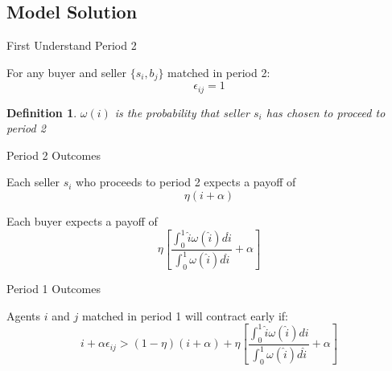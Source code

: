 \documentclass{beamer}
\newtheorem{deff}{Definition}
\begin{document}
\subsection{Model Solution}

\begin{frame}{First Understand Period 2}
\begin{lemma} \label{lemma:e_1}
	For any buyer and seller $\{s_i, b_j\}$ matched in period 2: 
	 $$\epsilon_{ij} = 1$$
\end{lemma}

\begin{deff}
	$\omega(i) $ is the probability that seller $s_i$ has chosen to proceed to period 2
	
\end{deff}
\end{frame}


\begin{frame}{Period 2 Outcomes}
\begin{lemma}
	Each seller $s_i$ who proceeds to period 2 expects a payoff of 
	\begin{equation}
	\eta (i+\alpha)
	\end{equation}
	
\end{lemma}

\begin{lemma}
	Each buyer expects a payoff of 
	\begin{equation} \label{eq:E_buyer}
	\eta  \left[ \frac{\int_0^1 \hat{i} \omega(\hat{i}) d\hat{i}}{\int_0^1  \omega(\hat{i}) d\hat{i} } + \alpha \right]
	\end{equation}
\end{lemma}

\end{frame}
\begin{frame}{Period 1 Outcomes}
	\begin{lemma}
		Agents $i$ and $j$ matched in period 1 will contract early if:
		\begin{equation} \label{eq:ec_condition_raw}
		i+\alpha \epsilon_{ij} >(1-\eta)(i+\alpha ) + \eta  \left[ \frac{\int_0^1 \hat{i} \omega(\hat{i}) di}{\int_0^1  \omega(\hat{i}) d\hat{i}} + \alpha \right] 
		\end{equation}
	\end{lemma}



\end{frame}
\end{document}
